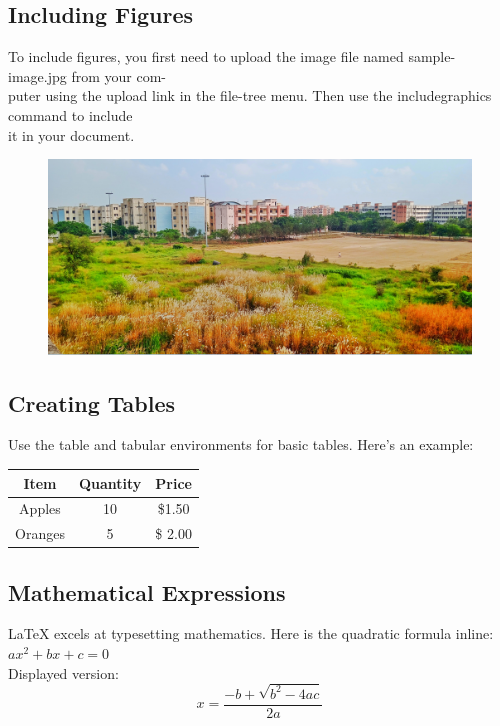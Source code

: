 \documentclass{article}
\begin{document}
	
	\subsection{Including Figures}
	To include figures, you first need to upload the image file named sample-image.jpg from your com-\\
	puter using the upload link in the file-tree menu. Then use the includegraphics command to include\\
	it in your document.\\
	\begin{figure}
		
		\includegraphics{rgukt.jpeg}
	\end{figure}
	
	\subsection{Creating Tables}
	Use the table and tabular environments for basic tables. Here’s an example:
	\begin{table}[h]
		\begin{tabular}{|c| c| c| }
			Item & Quantity & Price \\
			\hline
			Apples & 10 & \$1.50 \\
			
			Oranges & 5 & \$ 2.00
			
		\end{tabular}
	\end{table}
	
	
	\subsection{Mathematical Expressions}
	LaTeX excels at typesetting mathematics. Here is the quadratic formula inline: $ax^2 + bx + c = 0 $\\
	
	Displayed version:  $$ x = \frac{-b+\sqrt{b^2-4ac}}{2a} $$\\
	
\end{document}
